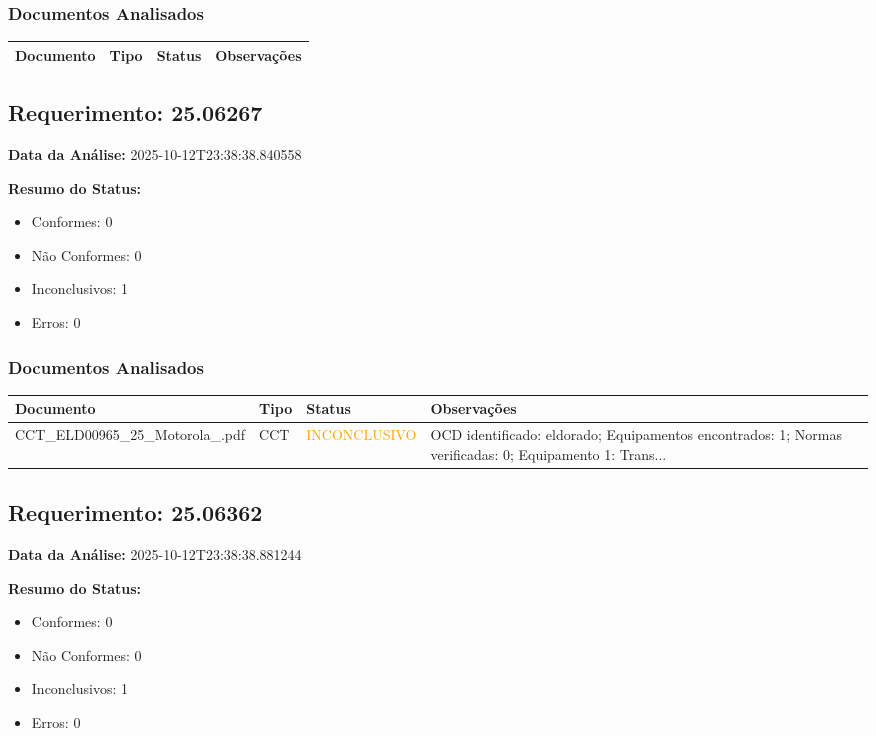 \documentclass[12pt,a4paper]{article}
\begin{document}
\subsubsection{Documentos Analisados}

\begin{longtable}{|p{4cm}|p{2cm}|p{2cm}|p{6cm}|}
\hline
\textbf{Documento} & \textbf{Tipo} & \textbf{Status} & \textbf{Observações} \\
\hline
\endhead
\end{longtable}


\subsection{Requerimento: 25.06267}

\textbf{Data da Análise:} 2025-10-12T23:38:38.840558

\textbf{Resumo do Status:}
\begin{itemize}
    \item Conformes: 0
    \item Não Conformes: 0
    \item Inconclusivos: 1
    \item Erros: 0
\end{itemize}

\subsubsection{Documentos Analisados}

\begin{longtable}{|p{4cm}|p{2cm}|p{2cm}|p{6cm}|}
\hline
\textbf{Documento} & \textbf{Tipo} & \textbf{Status} & \textbf{Observações} \\
\hline
\endhead
CCT\_ELD00965\_25\_Motorola\_.pdf & CCT & \textcolor{orange}{INCONCLUSIVO} & OCD identificado: eldorado; Equipamentos encontrados: 1; Normas verificadas: 0; Equipamento 1: Trans... \\
\hline
\end{longtable}


\subsection{Requerimento: 25.06362}

\textbf{Data da Análise:} 2025-10-12T23:38:38.881244

\textbf{Resumo do Status:}
\begin{itemize}
    \item Conformes: 0
    \item Não Conformes: 0
    \item Inconclusivos: 1
    \item Erros: 0
\end{itemize}
\end{document}
